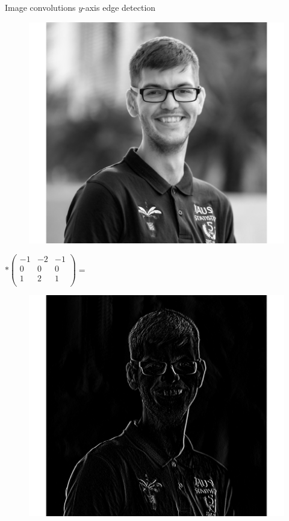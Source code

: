 \documentclass{beamer}
\begin{document}
\begin{frame}{Image convolutions}
$y$-axis edge detection

\begin{minipage}{0.32\linewidth}
\begin{figure}
\includegraphics[width=\linewidth]{Images/conv1.png}
\end{figure}

\end{minipage}
\begin{minipage}{0.32\linewidth}
$ * \begin{pmatrix}
-1& -2 & -1 \\
0& 0 & 0 \\
1& 2 & 1 \\
\end{pmatrix} =$
\end{minipage}
\begin{minipage}{0.32\linewidth}
\begin{figure}
\includegraphics[width=\linewidth]{Images/conv7.png}
\end{figure}
\end{minipage}
\end{frame}
\end{document}
